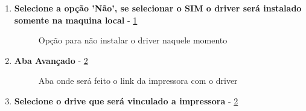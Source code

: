\begin{enumerate}
	\item \textbf{Selecione a opção 'Não', se selecionar o SIM o driver será instalado somente na maquina local} - \ref{opcao_nao}
	\begin{figure}[ht]
	   	\centering
	   	\caption{Opção para não instalar o driver naquele momento}
	    \label{opcao_nao}
	\end{figure}
	
	\item \textbf{Aba Avançado} - \ref{aba_avancado}
	\begin{figure}[ht]
	   	\centering
	   	\caption{Aba onde será feito o link da impressora com o driver}
	    \label{aba_avancado}
	\end{figure}
	
	\item \textbf{Selecione o drive que será vinculado a impressora} - \ref{aba_avancado}
	

\end{enumerate}
